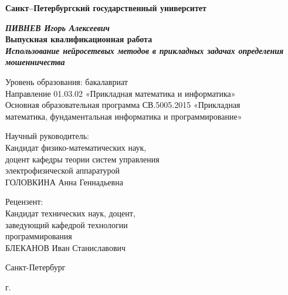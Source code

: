 \begin{titlepage}
\begin{center}

\textbf{Санкт--Петербургский государственный университет}

\vspace{34mm}

\textbf{\textit{\large ПИВНЕВ Игорь Алексеевич}} \\[8mm]
\textbf{\large Выпускная квалификационная работа} \\[3mm]
\textbf{\textit{\large Использование нейросетевых методов в прикладных задачах определения мошенничества}}

\vspace{15mm}

Уровень образования: бакалавриат \\
Направление 01.03.02 «Прикладная математика и информатика» \\
Основная образовательная программа СВ.5005.2015 «Прикладная \\
математика, фундаментальная информатика и программирование»

\vspace{10mm}
\begin{flushright}
\begin{minipage}[t]{0.65\textwidth}

{Научный руководитель:} \\
Кандидат физико-математических наук, \\
доцент кафедры теории систем управления \\
электрофизической аппаратурой \\
ГОЛОВКИНА Анна Геннадьевна

\vspace{10mm}

{Рецензент:} \\
Кандидат технических наук, доцент, \\
заведующий кафедрой технологии \\
программирования \\
БЛЕКАНОВ Иван Станиславович

\end{minipage}
\end{flushright}
\vfill

{Санкт-Петербург}
\par{\the\year{} г.}

\end{center}
\end{titlepage}
\restoregeometry
\addtocounter{page}{1}
